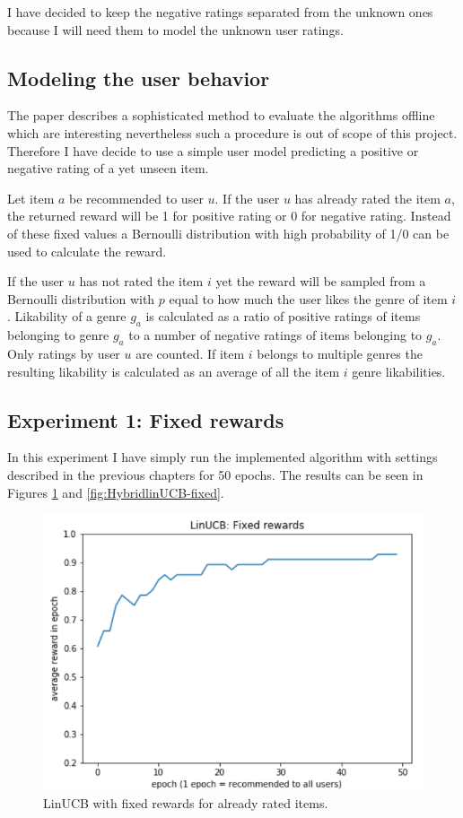 \documentclass[12pt, titlepage]{article}
\begin{document}
I have decided to keep the negative ratings separated from the unknown ones because I will need them to model the unknown user ratings.

\subsection{Modeling the user behavior}
The paper describes a sophisticated method to evaluate the algorithms offline which are interesting nevertheless such a procedure is out of scope of this project. Therefore I have decide to use a simple user model predicting a positive or negative rating of a yet unseen item.

Let item $a$ be recommended to user $u$.
If the user $u$ has already rated the item $a$, the returned reward will be 1 for positive rating or 0 for negative rating. Instead of these fixed values a Bernoulli distribution with high probability of 1/0 can be used to calculate the reward.

If the user $u$ has not rated the item $i$  yet the reward will be sampled from a Bernoulli distribution with $p$ equal to how much the user likes the genre of item $i$. Likability of a genre $g_a$ is calculated as a ratio of positive ratings of items belonging to genre $g_a$ to a number of negative ratings of items belonging to $g_a$. Only ratings by user $u$ are counted. If item $i$ belongs to multiple genres the resulting likability is calculated as an average of all the item $i$ genre likabilities.

\subsection{Experiment 1: Fixed rewards}
In this experiment I have simply run the implemented algorithm with settings described in the previous chapters for 50 epochs. The results can be seen in Figures \ref{fig:linUCB-fixed} and \ref{fig:HybridlinUCB-fixed}. 


\begin{figure}[h!]
 \centering
 \includegraphics[scale=0.5]{img/LinUCB-fixed}
 \caption{LinUCB with fixed rewards for already rated items.}
 \label{fig:linUCB-fixed}
\end{figure}
\end{document}
